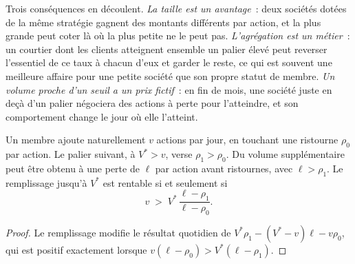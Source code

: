 Trois conséquences en découlent. \emph{La taille est un avantage}~: deux sociétés dotées de la même
stratégie gagnent des montants différents par action, et la plus grande peut coter là où la
plus petite ne le peut pas. \emph{L'agrégation est un métier}~: un courtier dont les clients
atteignent ensemble un palier élevé peut reverser l'essentiel de ce taux à chacun d'eux et
garder le reste, ce qui est souvent une meilleure affaire pour une petite société que son propre
statut de membre. \emph{Un volume proche d'un seuil a un prix fictif}~: en fin
de mois, une société juste en deçà d'un palier négociera des actions à perte pour l'atteindre,
et son comportement change le jour où elle l'atteint.

\begin{proposition}\label{prop:m1:getting-access-equities:padding}
Un membre ajoute naturellement $v$ actions par jour, en touchant une ristourne $\rho_0$ par action.
Le palier suivant, à $V^* > v$, verse $\rho_1 > \rho_0$. Du volume supplémentaire peut être obtenu
à une perte de $\ell$ par action avant ristournes, avec $\ell > \rho_1$. Le remplissage jusqu'à $V^*$
est rentable si et seulement si
\[
v \;>\; V^*\,\frac{\ell - \rho_1}{\ell - \rho_0}.
\]
\end{proposition}
\begin{proof}
Le remplissage modifie le résultat quotidien de $V^*\rho_1 - (V^*-v)\ell - v\rho_0$, qui
est positif exactement lorsque $v(\ell-\rho_0) > V^*(\ell-\rho_1)$.
\end{proof}

